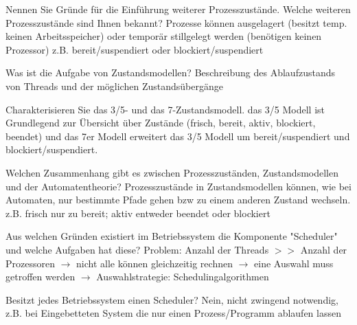 \documentclass[avery5371]{flashcards}
\begin{document}
\begin{flashcard}{Nennen Sie Gründe für die Einführung weiterer Prozesszustände. Welche weiteren Prozesszustände sind Ihnen bekannt?}
    Prozesse können ausgelagert (besitzt temp. keinen Arbeitsspeicher) oder temporär stillgelegt werden (benötigen keinen Prozessor) z.B. bereit/suspendiert oder blockiert/suspendiert 
\end{flashcard}

\begin{flashcard}{Was ist die Aufgabe von Zustandsmodellen?}
    Beschreibung des Ablaufzustands von Threads und der möglichen Zustandsübergänge
\end{flashcard}

\begin{flashcard}{Charakterisieren Sie das 3/5- und das 7-Zustandsmodell.}
    das 3/5 Modell ist Grundlegend zur Übersicht über Zustände (frisch, bereit, aktiv, blockiert, beendet) und das 7er Modell erweitert das 3/5 Modell um bereit/suspendiert und blockiert/suspendiert.
\end{flashcard}

\begin{flashcard}{Welchen Zusammenhang gibt es zwischen Prozesszuständen, Zustandsmodellen und der Automatentheorie?}
    Prozesszustände in Zustandsmodellen können, wie bei Automaten, nur bestimmte Pfade gehen bzw zu einem anderen Zustand wechseln. z.B. frisch nur zu bereit; aktiv entweder beendet oder blockiert 
\end{flashcard}

\begin{flashcard}[Scheduler]{Aus welchen Gründen existiert im Betriebssystem die Komponente "Scheduler" und welche Aufgaben hat diese?}
    Problem: Anzahl der Threads $>>$ Anzahl der Prozessoren $\rightarrow$ nicht alle können gleichzeitig rechnen $\rightarrow$ eine Auswahl muss getroffen werden $\rightarrow$ Auswahlstrategie: Schedulingalgorithmen
\end{flashcard}

\begin{flashcard}[Scheduler]{Besitzt jedes Betriebssystem einen Scheduler?}
    Nein, nicht zwingend notwendig, z.B. bei Eingebetteten System die nur einen Prozess/Programm ablaufen lassen
\end{flashcard}
\end{document}
